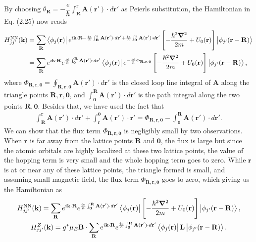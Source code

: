 \documentclass{report}
\newcommand{\f}[2]{\dfrac{#1}{#2}}
\begin{document}
By choosing $\theta_{\mathbf{R}} = - \f{e}{\hbar} \int_{\mathbf{R}}^{\mathbf{r}} \mathbf{A(\mathbf{r'})} \cdot d\mathbf{r'}$ as Peierls substitution, the Hamiltonian in Eq. (2.25) now reads
\begin{equation}
	\begin{aligned}
		H_{jj'}^{\text{NN}}(\mathbf{k})
		 & = \sum_{\mathbf{R}} \bra{\phi_{j}(\mathbf{r})} e^{i\mathbf{k \cdot R} - \frac{ie}{\hbar} \int_{\mathbf{R}}^{\mathbf{r}} \mathbf{A}(\mathbf{r'}) \cdot d\mathbf{r'} + \frac{ie}{\hbar}\int_{\mathbf{0}}^{\mathbf{r}}\mathbf{A(\mathbf{r'})}\cdot d\mathbf{r'} } \left[- \f{\hbar^{2} \boldsymbol{\nabla}^{2}}{2m} + U_{0} (\mathbf{r}) \right] \ket{\phi_{j'}(\mathbf{r - R})} \\
		 & = \sum_{\mathbf{R}}  e^{i\mathbf{k \cdot R}} e^{\frac{ie}{\hbar} \int_{\mathbf{0}}^{\mathbf{R}} \mathbf{A(\mathbf{r'})} \cdot d \mathbf{r'} } \bra{\phi_{j}(\mathbf{r})} e^{-\frac{ie}{\hbar} \Phi_{\mathbf{R,r,0}}} \left[ -\f{\hbar^{2} \boldsymbol{\nabla}^{2}}{2m} + U_{0} (\mathbf{r}) \right] \ket{\phi_{j'}(\mathbf{r - R})},
	\end{aligned}
\end{equation}
where $\Phi_{\mathbf{R,r,0}} = \oint_{\mathbf{R,r,0}} \mathbf{A(\mathbf{r'})} \cdot d\mathbf{r'} $ is the closed loop line integral of $\mathbf{A}$ along the triangle points $\mathbf{R,r,0}$, and $\int_{\mathbf{0}}^{\mathbf{R}} \mathbf{A(\mathbf{r'})} \cdot d \mathbf{r'}$ is the path integral along the two points $\mathbf{R,0}$. Besides that, we have used the fact that
\begin{align}
	\int_{\mathbf{R}}^{\mathbf{r}} \mathbf{A(\mathbf{r'})} \cdot d\mathbf{r'} + \int_{\mathbf{r}}^{\mathbf{0}} \mathbf{A(r')} \cdot \mathbf{r'} = \Phi_{\mathbf{R,r,0}} - \int_{\mathbf{0}}^{\mathbf{R}} \mathbf{A(\mathbf{r'})} \cdot d \mathbf{r'}.
\end{align}
We can show that the flux term $\Phi_{\mathbf{R,r,0}}$ is negligibly small \cite{yalcin_2019} by two observations. When $\mathbf{r}$ is far away from the lattice points $\mathbf{R}$ and $\mathbf{0}$, the flux is large but since the atomic orbitals are highly localized at these two lattice points, the value of the hopping term is very small and the whole hopping term goes to zero. While $\mathbf{r}$ is at or near any of these lattice points, the triangle formed is small, and assuming small magnetic field, the flux term $\Phi_{\mathbf{R,r,0}}$ goes to zero, which giving us the Hamiltonian as
\begin{gather}
	H_{jj'}^{\text{NN}}(\mathbf{k})
	= \sum_{\mathbf{R}} e^{i\mathbf{k \cdot R}}e^{\frac{ie}{\hbar} \int_{\mathbf{0}}^{\mathbf{R}} \mathbf{A(\mathbf{r'})} \cdot d \mathbf{r'} } \bra{\phi_{j}(\mathbf{r})} \left[ -\f{\hbar^{2} \boldsymbol{\nabla}^{2}}{2m} + U_{0} (\mathbf{r}) \right] \ket{\phi_{j'}(\mathbf{r - R})},\\
	H_{jj'}^{Z}(\mathbf{k})
	= g^{*} \mu_{B} \mathbf{B} \cdot \sum_{\mathbf{R}} e^{i\mathbf{k \cdot R}}e^{\frac{ie}{\hbar} \int_{\mathbf{0}}^{\mathbf{R}} \mathbf{A(\mathbf{r'})} \cdot d \mathbf{r'}} \bra{\phi_{j}(\mathbf{r})} \mathbf{L} \ket{\phi_{j'}(\mathbf{r - R})}.
\end{gather}
\end{document}

